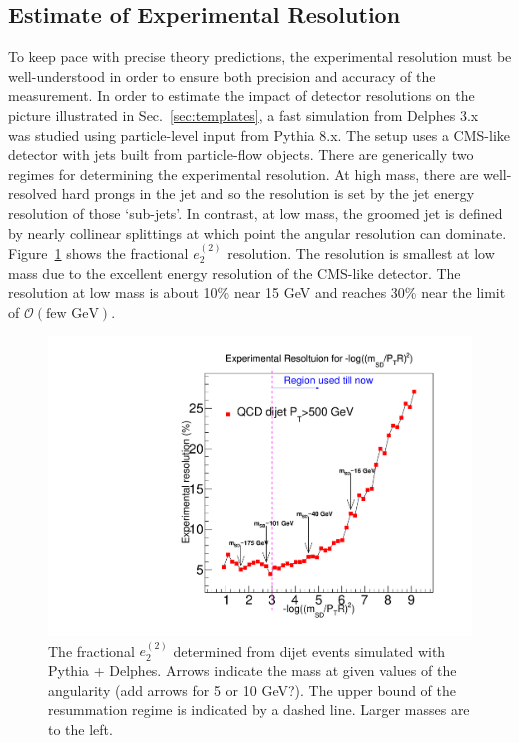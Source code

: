 \subsection{Estimate of Experimental Resolution}
\label{sec:resolution}

To keep pace with precise theory predictions, the experimental resolution must be well-understood in order to ensure both precision and accuracy of the measurement.  In order to estimate the impact of detector resolutions on the picture illustrated in Sec.~\ref{sec:templates}, a fast simulation from Delphes 3.x~\cite{deFavereau:2013fsa} was studied using particle-level input from Pythia 8.x.  The setup uses a CMS-like detector with jets built from particle-flow objects.  There are generically two regimes for determining the experimental resolution.  At high mass, there are well-resolved hard prongs in the jet and so the resolution is set by the jet energy resolution of those `sub-jets'.  In contrast, at low mass, the groomed jet is defined by nearly collinear splittings at which point the angular resolution can dominate.  Figure~\ref{fig:resolution} shows the fractional $e_2^{(2)}$ resolution.  The resolution is smallest at low mass due to the excellent energy resolution of the CMS-like detector.  The resolution at low mass is about 10\% near 15 GeV and reaches 30\% near the limit of $\mathcal{O}(\text{few GeV})$.  

\begin{figure}[h!]
\begin{center}
\includegraphics[width = 0.49\columnwidth]{figures/Experimental_Resolution_logrho.pdf}
\end{center}
\caption{The fractional $e_2^{(2)}$ determined from dijet events simulated with Pythia + Delphes.  Arrows indicate the mass at given values of the angularity (add arrows for 5 or 10 GeV?).  The upper bound of the resummation regime is indicated by a dashed line.  Larger masses are to the left.}
\label{fig:resolution}
\end{figure}

